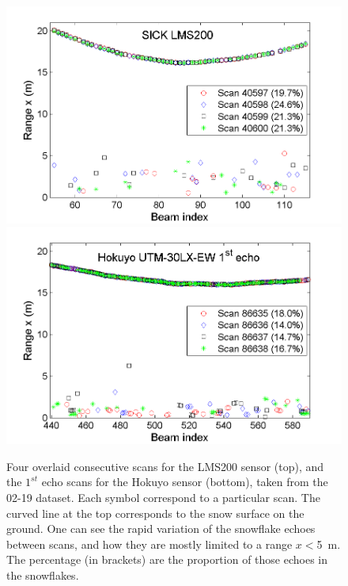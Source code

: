  \begin{figure}[th]
    \centering
    \includegraphics[width=0.95\linewidth]{./img/LMS200_4Scans_Feb19.png}
    \includegraphics[width=0.95\linewidth]{./img/Hokuyo_4Scans_Feb19.png}
    \caption{Four overlaid consecutive scans for the LMS200 sensor (top), and the $1^{st}$ echo scans for the Hokuyo sensor (bottom), taken from the 02-19 dataset. Each symbol correspond to a particular scan. The curved line at the top corresponds to the snow surface on the ground. One can see the rapid variation of the snowflake echoes between scans, and how they are mostly limited to a range $x<$\SI{5}{\meter}. The percentage (in brackets) are the proportion of those echoes in the snowflakes.}
    \label{fig:LMS200_4Scans_Feb19}
\end{figure}

